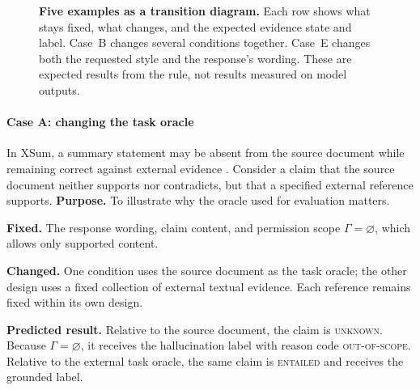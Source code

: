 \documentclass{clv2025}
\newcommand{\Grd}{\textsc{G}}
\begin{document}
\begin{figure}[!ht]
{%
}
\caption{\textbf{Five examples as a transition diagram.}
Each row shows what stays fixed, what changes, and the expected evidence
state and label. Case~B changes several conditions together. Case~E changes
both the requested style and the response's wording. These are expected
results from the rule, not results measured on model outputs.}
\label{fig:case-transitions}
\end{figure}
\FloatBarrier
\paragraph{Case A: changing the task oracle}
In XSum, a summary statement may be absent from the source document while
remaining correct against external evidence \citep{maynez_faithfulness_2020}.
Consider a claim that the source document neither supports nor contradicts,
but that a specified external reference supports.
\textbf{Purpose.} To illustrate why the oracle used for evaluation matters.
\par\textbf{Fixed.} The response wording, claim content, and permission scope
$\Gamma=\varnothing$, which allows only supported content.
\par\textbf{Changed.} One condition uses the source document as the task oracle;
the other design uses a fixed collection of external textual evidence.
Each reference remains fixed within its own design.
\par\textbf{Predicted result.} Relative to the source document, the claim is
\textsc{unknown}. Because $\Gamma=\varnothing$, it receives the hallucination
label with reason code \textsc{out-of-scope}. Relative to the external task
oracle, the same claim is \textsc{entailed} and receives the grounded label.
\end{document}
